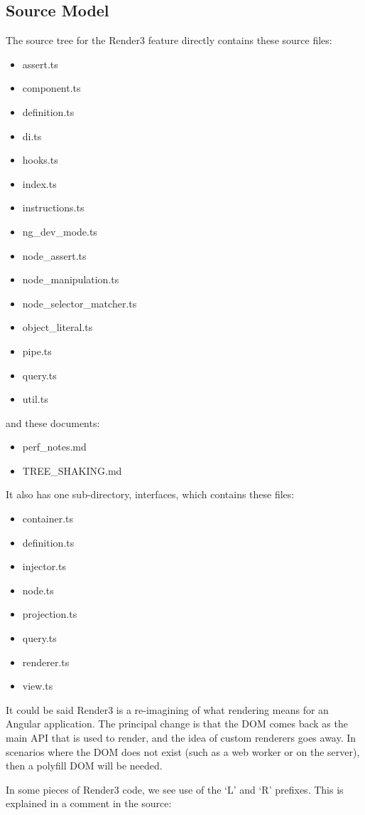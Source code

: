 \subsection{Source Model}

The source tree for the Render3 feature directly contains these source files:

\begin{itemize}
  \item assert.ts
  \item component.ts
  \item definition.ts
  \item di.ts
  \item hooks.ts
  \item index.ts
  \item instructions.ts
  \item ng\_dev\_mode.ts
  \item node\_assert.ts
  \item node\_manipulation.ts
  \item node\_selector\_matcher.ts
  \item object\_literal.ts
  \item pipe.ts
  \item query.ts
  \item util.ts
\end{itemize}

and these documents:

\begin{itemize}
  \item perf\_notes.md
  \item TREE\_SHAKING.md
\end{itemize}

It also has one sub-directory, interfaces, which contains these files:

\begin{itemize}
  \item container.ts
  \item definition.ts
  \item injector.ts
  \item node.ts
  \item projection.ts
  \item query.ts
  \item renderer.ts
  \item view.ts
\end{itemize}

It could be said Render3 is a re-imagining of what rendering means for an Angular
application. The principal change is that the DOM comes back as the main API that is
used to render, and the idea of custom renderers goes away. In scenarios where the
DOM does not exist (such as a web worker or on the server), then a polyfill DOM will
be needed.

In some pieces of Render3 code, we see use of the ‘L’ and ‘R’ prefixes. This is
explained in a comment in the source:


